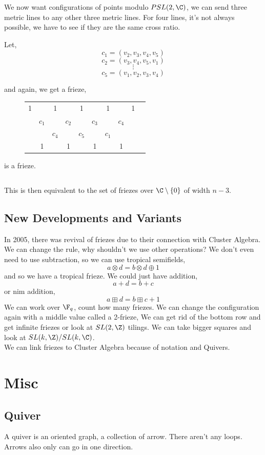 \documentclass{article}
\begin{document}
\newpage
We now want configurations of points modulo $PSL(2, \C)$, we can send three metric lines to any other three metric lines. For four lines, it's not always possible, we have to see if they are the same cross ratio.

Let,
$$ c_1 = (v_2, v_3, v_4, v_5) $$
$$ c_2 = (v_3, v_4, v_5, v_1) $$
$$ \vdots $$
$$ c_5 = (v_1, v_2, v_3, v_4) $$

and again, we get a frieze,
\begin{figure}[!ht]
\centering
\begin{tabular}{cccccccccc}
 1&&1&&1&&1&&1& \\
 &$c_1$&&$c_2$&&$c_3$&&$c_4$&&\\
 &&$c_4$&&$c_5$&&$c_1$&&\\
 &1&&1&&1&&1&& \\
\end{tabular}
\end{figure}

is a frieze.

$$  $$

This is then equivalent to the set of friezes over $\C \setminus \{0\}$ of width $n-3$.

\subsection{New Developments and Variants}
In 2005, there was revival of friezes due to their connection with Cluster Algebra. We can change the rule, why shouldn't we use other operations? We don't even need to use subtraction, so we can use tropical semifields,
$$ a \otimes d = b \otimes d \oplus 1 $$
and so we have a tropical frieze. We could just have addition,
$$ a + d = b + c $$
or nim addition,
$$ a \boxplus d = b \boxplus c +1 $$
We can work over $\F_q$, count how many friezes. We can change the configuration again with a middle value called a 2-frieze,
We can get rid of the bottom row and get infinite friezes or look at $SL(2, \Z)$ tilings. We can take bigger squares and look at $SL(k, \Z) / SL(k, \C)$.\\

We can link friezes to Cluster Algebra because of notation and Quivers.

\section{Misc}

\subsection{Quiver}
A quiver is an oriented graph, a collection of arrow. There aren't any loops. Arrows also only can go in one direction.
\end{document}
